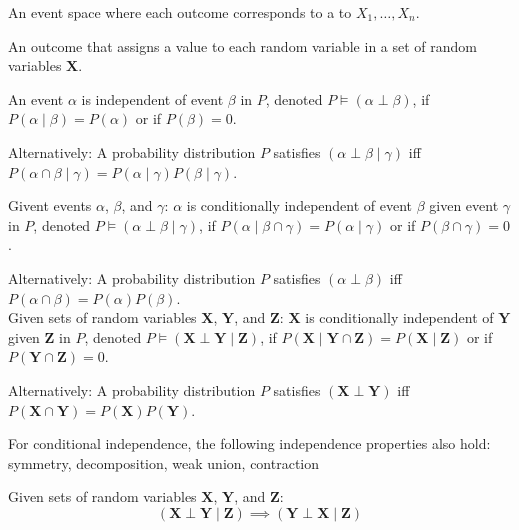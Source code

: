 {%
  An \gls{event space} where each outcome corresponds to a  to $X_1,\dots, X_n$.
}

{%
  An outcome that assigns a value to each \gls{random variable} in a set of random variables $\bm{X}$.
}

{%
  An event $\alpha$ is independent of event $\beta$ in $P$, denoted $P\models(\alpha\perp\beta)$, if $P(\alpha\mid\beta)=P(\alpha)$ or if $P(\beta)=0$.

  Alternatively: A \gls{probability distribution} $P$ satisfies $(\alpha\perp\beta\mid\gamma)$ \acrshort{iff} $P(\alpha\cap\beta\mid\gamma)=P(\alpha\mid\gamma)P(\beta\mid\gamma)$.
}

{%
  Givent events $\alpha$, $\beta$, and $\gamma$: $\alpha$ is conditionally independent of event $\beta$ given event $\gamma$ in $P$, denoted $P\models(\alpha\perp\beta\mid\gamma)$, if $P(\alpha\mid\beta\cap\gamma)=P(\alpha\mid\gamma)$ or if $P(\beta\cap\gamma)=0$.

  Alternatively: A \gls{probability distribution} $P$ satisfies $(\alpha\perp\beta)$ \acrshort{iff} $P(\alpha\cap\beta)=P(\alpha)P(\beta)$.\\[0.1cm]

  Given sets of random variables $\bm{X}$, $\bm{Y}$, and $\bm{Z}$: $\bm{X}$ is conditionally independent of $\bm{Y}$ given $\bm{Z}$ in $P$, denoted $P\models(\bm{X}\perp\bm{Y}\mid\bm{Z})$, if $P(\bm{X}\mid\bm{Y}\cap\bm{Z})=P(\bm{X}\mid\bm{Z})$ or if $P(\bm{Y}\cap\bm{Z})=0$.

  Alternatively: A \gls{probability distribution} $P$ satisfies $(\bm{X}\perp\bm{Y})$ \acrshort{iff} $P(\bm{X}\cap\bm{Y})=P(\bm{X})P(\bm{Y})$.

  For conditional independence, the following independence properties also hold: \gls{symmetry}, \gls{decomposition}, \gls{weak union}, \gls{contraction}
}

{%
  Given sets of random variables $\bm{X}$, $\bm{Y}$, and $\bm{Z}$:
  \begin{equation*}
    (\bm{X}\perp\bm{Y}\mid\bm{Z})\implies(\bm{Y}\perp\bm{X}\mid\bm{Z})
  \end{equation*}
}

